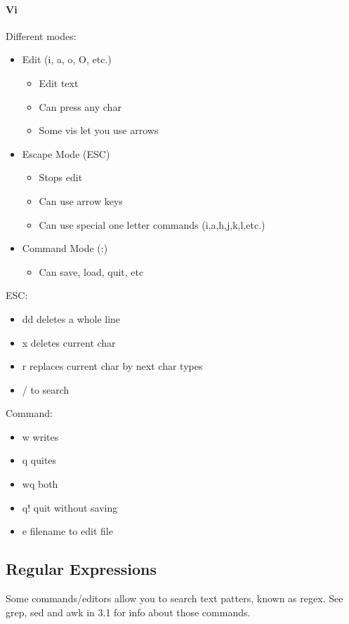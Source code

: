 \documentclass[12 pt]{article}
\begin{document}
	\paragraph{Vi}
	Different modes: 
	\begin{itemize}
		\item Edit (i, a, o, O, etc.)
		\begin{itemize}
			\item Edit text
			\item Can press any char
			\item Some vis let you use arrows
		\end{itemize}
		\item Escape Mode (ESC)
		\begin{itemize}
			\item Stops edit
			\item Can use arrow keys
			\item Can use special one letter commands (i,a,h,j,k,l,etc.)
		\end{itemize}
		\item Command Mode (:)
		\begin{itemize}
			\item Can save, load, quit, etc
		\end{itemize}
	\end{itemize}
	ESC: \begin{itemize}
		\item dd deletes a whole line
		\item x deletes current char
		\item r replaces current char by next char types
		\item / to search
	\end{itemize}
	Command: \begin{itemize}
		\item w writes
		\item q quites
		\item wq both
		\item q! quit without saving
		\item e filename to edit file
	\end{itemize}
	\subsection{Regular Expressions} Some commands/editors allow you to search text patters, known as regex. See grep, sed and awk in 3.1 for info about those commands. 
\end{document}
